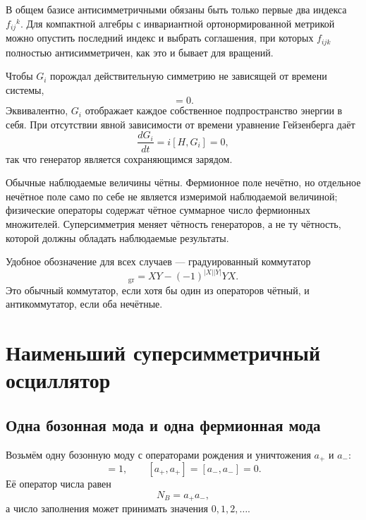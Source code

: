 В общем базисе антисимметричными обязаны быть только первые два индекса \(f_{ij}{}^k\). Для компактной алгебры с инвариантной ортонормированной метрикой можно опустить последний индекс и выбрать соглашения, при которых \(f_{ijk}\) полностью антисимметричен, как это и бывает для вращений. 

Чтобы \(G_i\) порождал действительную симметрию не зависящей от времени системы,
\begin{equation}
[H,G_i]=0.
\end{equation}
Эквивалентно, \(G_i\) отображает каждое собственное подпространство энергии в себя. При отсутствии явной зависимости от времени уравнение Гейзенберга даёт
\begin{equation}
\frac{dG_i}{dt}=i[H,G_i]=0,
\end{equation}
так что генератор является сохраняющимся зарядом.

Обычные наблюдаемые величины чётны. Фермионное поле нечётно, но отдельное нечётное поле само по себе не является измеримой наблюдаемой величиной; физические операторы содержат чётное суммарное число фермионных множителей. Суперсимметрия меняет чётность генераторов, а не ту чётность, которой должны обладать наблюдаемые результаты.

Удобное обозначение для всех случаев — градуированный коммутатор
\begin{equation}
[X,Y]_{\mathrm{gr}}
=XY-(-1)^{|X||Y|}YX.
\end{equation}
Это обычный коммутатор, если хотя бы один из операторов чётный, и антикоммутатор, если оба нечётные.

\section{Наименьший суперсимметричный осциллятор}

\subsection{Одна бозонная мода и одна фермионная мода}

Возьмём одну бозонную моду с операторами рождения и уничтожения \(a_+\) и \(a_-\):
\begin{equation}
[a_-,a_+]=1,
\qquad
[a_+,a_+]=[a_-,a_-]=0.
\end{equation}
Её оператор числа равен
\begin{equation}
N_B=a_+a_-,
\end{equation}
а число заполнения может принимать значения \(0,1,2,\ldots\).

